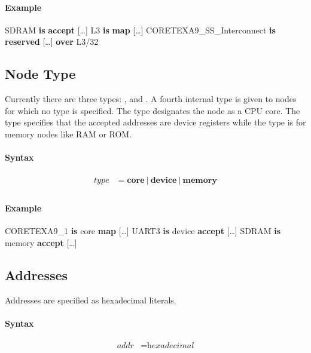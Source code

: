 \documentclass[a4paper,11pt,twoside]{report}
\begin{document}
{{{\paragraph{Example}
\begin{example}
    SDRAM \textbf{is} \textbf{accept} [\ldots]
    L3 \textbf{is} \textbf{map} [\ldots]
    CORETEXA9_SS_Interconnect \textbf{is} \textbf{reserved} [\ldots] \textbf{over} L3/32
\end{example}

\subsection{Node Type}
Currently there are three types: ,  and . A fourth internal type  is given to nodes for which no type is specified.
The  type designates the node as a CPU core. The  type specifies that the accepted addresses are device registers while the  type is for memory nodes like RAM or ROM.

\paragraph{Syntax}
\begin{align*}
\textit{type} & \mathop{=}
    \textbf{core}\
    |\
    \textbf{device}\
    |\
    \textbf{memory} \\
\end{align*}

\paragraph{Example}
\begin{example}
    CORETEXA9_1 \textbf{is} core \textbf{map} [\ldots]
    UART3 \textbf{is} device \textbf{accept} [\ldots]
    SDRAM \textbf{is} memory \textbf{accept} [\ldots]
\end{example}

\subsection{Addresses}
Addresses are specified as hexadecimal literals.

\paragraph{Syntax}
\begin{align*}
\textit{addr} & \mathop{=} \textit{hexadecimal} \\
\end{align*}

}}}
\end{document}
